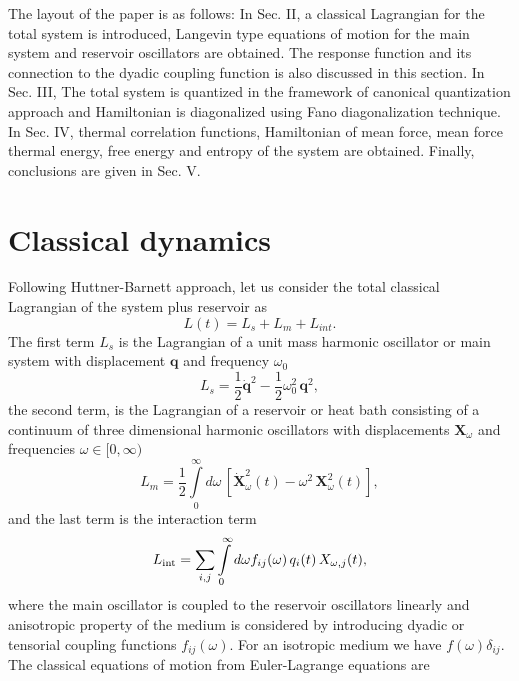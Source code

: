 \documentclass[preprint,showpacs,showkeys,groupedaddress,superscriptaddress]{revtex4}
\begin{document}
The layout of the paper is as follows: In Sec. II, a classical Lagrangian for the total system is introduced, Langevin type equations of motion for the main system and reservoir oscillators are obtained. The response function and its connection to the dyadic coupling function is also discussed in this section. In Sec. III, The total system is quantized in the framework of canonical quantization approach and Hamiltonian is diagonalized using Fano diagonalization technique. In Sec. IV, thermal correlation functions, Hamiltonian of mean force, mean force thermal energy, free energy and entropy of the system are obtained. Finally, conclusions are given in Sec. V.
\section{Classical dynamics }\label{Classical dynamics}
\noindent
Following Huttner-Barnett approach, let us consider the total classical Lagrangian of the system plus reservoir as
\begin{equation}
L(t)=L_s+L_m+L_{int}.
\end{equation}
The first term $L_s$ is the Lagrangian of a unit mass harmonic oscillator or main system with displacement $\mathbf{q}$ and frequency $\omega_0$
\begin{equation}
L_s  = \frac{1}{2} \dot{\mathbf{q}}^2  - \frac{1}{2}\omega _0 ^2 \,\mathbf{q}^2,
\end{equation}
the second term, is the Lagrangian of a reservoir or heat bath consisting of a continuum of three dimensional harmonic oscillators with displacements $\mathbf{X}_{\omega}$ and frequencies $\omega \in [0,\infty )$
\begin{equation}
L _m= \frac{1}{2}\int\limits_0^\infty d\omega\,[\dot{\mathbf{X}}_\omega ^2 (t) - \omega ^2 \,\mathbf{X}_\omega ^2 (t)],
\end{equation}
and the last term is the interaction term
\begin{equation}
L_{{\mathop{\rm int}} }  = \sum\limits_{i,j} {\int\limits_0^\infty  {d\omega } } f_{ij} (\omega )\,q_i (t)\,X_{\omega, j} (t),
\end{equation}
where the main oscillator is coupled to the reservoir oscillators linearly and anisotropic property of the medium is considered by introducing dyadic or tensorial coupling functions $f_{ij}(\omega)$. For an isotropic medium we have $f(\omega)\delta_{ij}$. The classical equations of motion from Euler-Lagrange equations are
\end{document}
